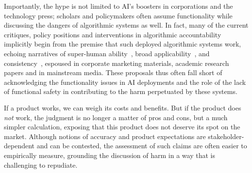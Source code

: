 \documentclass[acmconf,manuscript,screen,natbib=true]{acmart}
\newcommand{\ignore}[2]{\hspace{0in}#2}
\begin{document}
Importantly, the hype is not limited to AI's boosters in corporations and the technology press; scholars and policymakers often assume functionality while discussing the dangers of algorithmic systems as well. %
In fact, many of the current critiques, policy positions and interventions in algorithmic accountability implicitly begin from the  premise that such deployed algorithmic systems work, echoing narratives of super-human ability~\cite{firestone2020performance},
broad applicability~\cite{grover},  
and consistency~\cite{pineau2021improving}, 
espoused in corporate marketing materials, academic research papers and in mainstream media. These proposals thus often fall short of acknowledging the functionality issues in AI deployments and the role of the lack of functional safety in contributing to the harm perpetuated by these systems.

\ignore{The myth of functionality is one held dearly by corporate stakeholders and their investors.} If a product works, we can weigh its costs and benefits. But if the product does \emph{not} work, the judgment is no longer a matter of pros and cons, but a much simpler calculation, exposing that this product does not deserve its spot on the market. 
Although notions of accuracy and product expectations are stakeholder-dependent and can be contested, the assessment of such claims are often easier to empirically measure, grounding the discussion of harm in a way that is challenging to repudiate.
\end{document}

